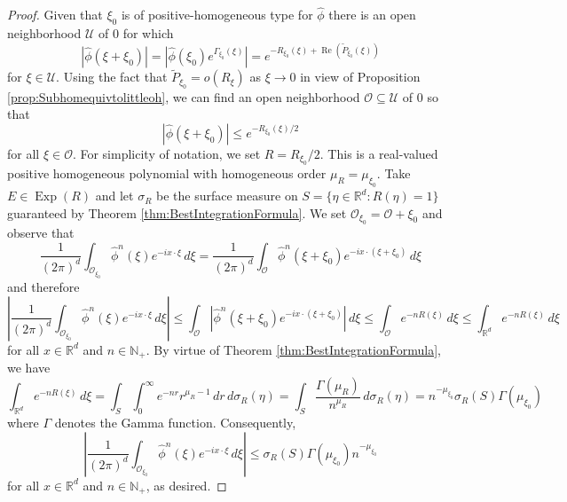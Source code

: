 \documentclass[11pt]{article}
\renewcommand\Re{\operatorname{Re}}%
\newcommand\Exp{\operatorname{Exp}}
\begin{document}
\begin{proof}
Given that $\xi_0$ is of positive-homogeneous type for $\widehat{\phi}$ there is an open neighborhood $\mathcal{U}$ of $0$ for which
\begin{equation*}
    \left|\widehat{\phi}(\xi+\xi_0)\right|=\left|\widehat{\phi}(\xi_0)e^{\Gamma_{\xi_0}(\xi)}\right|=e^{-R_{\xi_0}(\xi)+\Re\left(\widetilde{P}_{\xi_0}(\xi)\right)}
\end{equation*}
for $\xi\in \mathcal{U}$. Using the fact that $\widetilde{P}_{\xi_0}=o(R_{\xi})$ as $\xi\to 0$ in view of Proposition \ref{prop:Subhomequivtolittleoh}, we can find an open neighborhood $\mathcal{O}\subseteq\mathcal{U}$ of $0$  so that
\begin{equation*}
    \left|\widehat{\phi}(\xi+\xi_0)\right|\leq e^{-R_{\xi_0}(\xi)/2}
\end{equation*}
for all $\xi\in\mathcal{O}$. For simplicity of notation, we set $R=R_{\xi_0}/2$. This is a real-valued positive homogeneous polynomial with homogeneous order $\mu_R=\mu_{\xi_0}$. Take $E\in\Exp(R)$ and let $\sigma_R$ be the surface measure on  $S=\{\eta\in\mathbb{R}^d:R(\eta)=1\}$ guaranteed by Theorem \ref{thm:BestIntegrationFormula}.  We set $\mathcal{O}_{\xi_0}=\mathcal{O}+\xi_0$ and observe that
\begin{equation*}
    \frac{1}{(2\pi)^d}\int_{\mathcal{O}_{\xi_0}}\widehat{\phi}^n(\xi)e^{-ix\cdot\xi}\,d\xi=\frac{1}{(2\pi)^d}\int_{\mathcal{O}}\widehat{\phi}^n(\xi+\xi_0)e^{-ix\cdot(\xi+\xi_0)}\,d\xi
\end{equation*}
and therefore
\begin{equation*}
    \left|\frac{1}{(2\pi)^d}\int_{\mathcal{O}_{\xi_0}}\widehat{\phi}^n(\xi)e^{-ix\cdot\xi}\,d\xi\right|\leq \int_{\mathcal{O}}\left|\widehat{\phi}^n(\xi+\xi_0)e^{-i x\cdot(\xi+\xi_0)}\right|\,d\xi\leq \int_{\mathcal{O}}e^{-nR(\xi)}\,d\xi\leq\int_{\mathbb{R}^d} e^{-nR(\xi)}\,d\xi
\end{equation*}
for all $x\in\mathbb{R}^d$ and $n\in\mathbb{N}_+$. By virtue of Theorem \ref{thm:BestIntegrationFormula}, we have
\begin{equation*}
\int_{\mathbb{R}^d}e^{-nR(\xi)}\,d\xi=\int_S \int_0^\infty e^{-nr}r^{\mu_R-1}\,dr\,d\sigma_R(\eta)=\int_S \frac{\Gamma(\mu_R)}{n^{\mu_R}}\,d\sigma_R(\eta)=n^{-\mu_{\xi_0}}\sigma_R(S)\Gamma(\mu_{\xi_0})
\end{equation*}
where $\Gamma$ denotes the Gamma function. Consequently,
\begin{equation*}
    \left|\frac{1}{(2\pi)^d}\int_{\mathcal{O}_{\xi_0}}\widehat{\phi}^n(\xi)e^{-ix\cdot\xi}\,d\xi\right|\leq \sigma_R(S)\Gamma(\mu_{\xi_0})n^{-\mu_{\xi_0}}
\end{equation*}
for all $x\in\mathbb{R}^d$ and $n\in\mathbb{N}_+$, as desired.
\end{proof}
\end{document}
